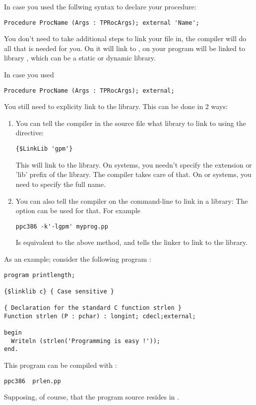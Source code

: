\documentclass{report}
\begin{document}
In case you used the follwing syntax to declare your procedure:
\begin{verbatim}
Procedure ProcName (Args : TPRocArgs); external 'Name';
\end{verbatim}
You don't need to take additional steps to link your file in, the compiler
will do all that is needed for you. On \windowsnt it will link to
, on \linux your program will be linked to library 
, which can be a static or dynamic library.

In case you used
\begin{verbatim}
Procedure ProcName (Args : TPRocArgs); external;
\end{verbatim}
You still need to explicity link to the library. This can be done in 2 ways:
\begin{enumerate}
\item You can tell the compiler in the source file what library to link to
using the  directive:
\begin{verbatim}
{$LinkLib 'gpm'}
\end{verbatim}
This will link to the  library. On \linux systems, you needn't
specify the extension or 'lib' prefix of the library. The compiler takes
care of that. On \dos or \windows systems, you need to specify the full
name.
\item You can also tell the compiler on the command-line to link in a
library: The  option can be used for that. For example
\begin{verbatim}
ppc386 -k'-lgpm' myprog.pp
\end{verbatim}
Is equivalent to the above method, and tells the linker to link to the
 library.
\end{enumerate}

As an example; consider the following program :
\begin{verbatim}
program printlength;

{$linklib c} { Case sensitive }

{ Declaration for the standard C function strlen }
Function strlen (P : pchar) : longint; cdecl;external;

begin
  Writeln (strlen('Programming is easy !'));
end.
\end{verbatim}
This program can be compiled with :
\begin{verbatim}
ppc386  prlen.pp
\end{verbatim}
Supposing, of course, that the program source resides in .
\end{document}
